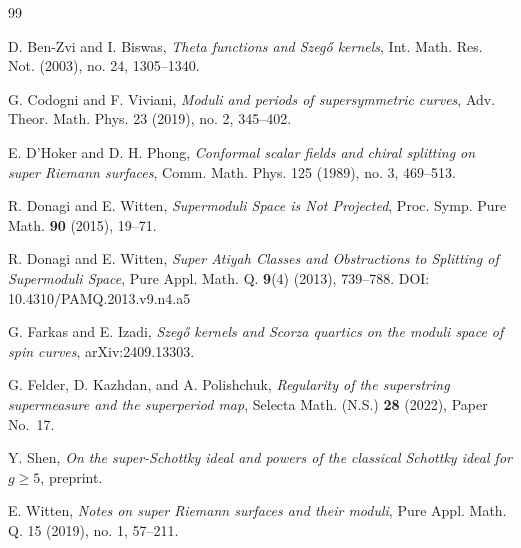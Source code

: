 \documentclass[11pt]{article}
\begin{document}
\begin{thebibliography}{99}

D. Ben-Zvi and I. Biswas,
\emph{Theta functions and Szeg\H{o} kernels},
Int. Math. Res. Not. (2003), no. 24, 1305--1340.

G. Codogni and F. Viviani,
\emph{Moduli and periods of supersymmetric curves},
Adv. Theor. Math. Phys. 23 (2019), no. 2, 345--402.

E. D’Hoker and D. H. Phong,
\emph{Conformal scalar fields and chiral splitting on super Riemann surfaces},
Comm. Math. Phys. 125 (1989), no. 3, 469--513.


R. Donagi and E. Witten,
\emph{Supermoduli Space is Not Projected},
Proc. Symp. Pure Math. \textbf{90} (2015), 19--71.

R. Donagi and E. Witten,
\emph{Super Atiyah Classes and Obstructions to Splitting of Supermoduli Space},
Pure Appl. Math. Q. \textbf{9}(4) (2013), 739--788.
DOI: 10.4310/PAMQ.2013.v9.n4.a5

G. Farkas and E. Izadi,
\emph{Szeg\H{o} kernels and Scorza quartics on the moduli space of spin curves},
arXiv:2409.13303.

G. Felder, D. Kazhdan, and A. Polishchuk,
\emph{Regularity of the superstring supermeasure and the superperiod map},
Selecta Math. (N.S.) \textbf{28} (2022), Paper No.~17.

Y. Shen,
\emph{On the super-Schottky ideal and powers of the classical Schottky ideal for $g\ge 5$},
preprint.

E. Witten,
\emph{Notes on super Riemann surfaces and their moduli},
Pure Appl. Math. Q. 15 (2019), no. 1, 57--211.

\end{thebibliography}
\end{document}
